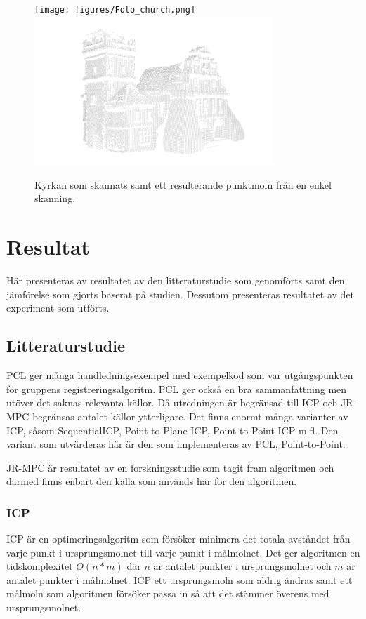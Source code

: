 \begin{figure}[H]
	\centering
	\texttt{[image: figures/Foto\_church.png]}
	\includegraphics[width=90mm]{figures/icke_komplett_moln_kyrka.png}
	\caption{Kyrkan som skannats samt ett resulterande punktmoln från en enkel skanning.}
	\label{fig:karlsson-single_scan-church}
\end{figure}


\section{Resultat}
\label{sec:results-karlsson}

Här presenteras av resultatet av den litteraturstudie som genomförts samt den jämförelse som gjorts baserat på studien. Dessutom presenteras resultatet av det experiment som utförts.

\subsection{Litteraturstudie}
PCL \cite{pcl_home} ger många handledningsexempel med exempelkod som var utgångspunkten för gruppens registreringsalgoritm. PCL ger också en bra sammanfattning men utöver det saknas relevanta källor. Då utredningen är begränsad till ICP och JR-MPC begränsas antalet källor ytterligare. Det finns enormt många varianter av ICP, såsom SequentialICP, Point-to-Plane ICP, Point-to-Point ICP m.fl. Den variant som utvärderas här är den som implementeras av PCL, Point-to-Point. 

JR-MPC \cite{Evangelidis-ECCV-2014} är resultatet av en forskningsstudie som tagit fram algoritmen och därmed finns enbart den källa som används här för den algoritmen.

\subsubsection{ICP}
\label{sec:icp-karlsson}
ICP är en optimeringsalgoritm som försöker minimera det totala avståndet från varje punkt i ursprungsmolnet till varje punkt i målmolnet. Det ger algoritmen en tidskomplexitet $ \mathit{O(n*m)} $ där $ \mathit{n} $ är antalet punkter i ursprungsmolnet och $ \mathit{m} $ är antalet punkter i målmolnet. ICP ett ursprungsmoln som aldrig ändras samt ett målmoln som algoritmen försöker passa in så att det stämmer överens med ursprungsmolnet. 

